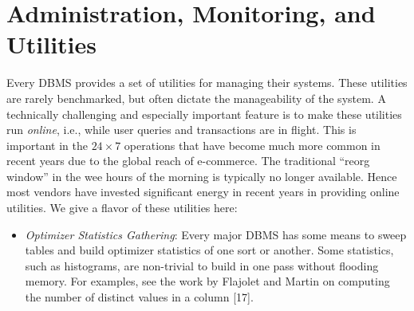 \documentclass[a4paper,11pt,twoside,openright]{book}
\begin{document}
\hypertarget{administration-monitoring-and-utilities}{%
\section{Administration, Monitoring, and
Utilities}\label{administration-monitoring-and-utilities}}

Every DBMS provides a set of utilities for managing their systems. These
utilities are rarely benchmarked, but often dictate the manageability of
the system. A technically challenging and especially important feature
is to make these utilities run \emph{online}, i.e., while user queries
and transactions are in flight. This is important in the $24 \times 7$
operations that have become much more common in recent years due to the
global reach of e-commerce. The traditional ``reorg window'' in the wee
hours of the morning is typically no longer available. Hence most
vendors have invested significant energy in recent years in providing
online utilities. We give a flavor of these utilities here:

\begin{itemize}

\item
  \emph{Optimizer Statistics Gathering}: Every major DBMS has some means
  to sweep tables and build optimizer statistics of one sort or another.
  Some statistics, such as histograms, are non-trivial to build in one
  pass without flooding memory. For examples, see the work by Flajolet
  and Martin on computing the number of distinct values in a column
  {[}17{]}.
\end{itemize}
\end{document}

